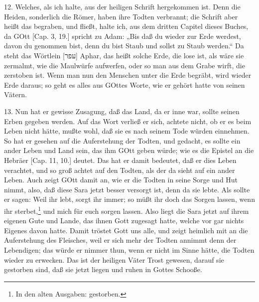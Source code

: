12. Welches, als ich halte, aus der heiligen Schrift hergekommen ist. Denn die Heiden, sonderlich die Römer, haben ihre Todten verbrannt; die Schrift aber heißt das begraben, und fließt, halte ich, aus dem dritten Capitel dieses Buches, da GOtt [Cap. 3, 19.] spricht zu Adam: „Bis daß du wieder zur Erde werdest, davon du genommen bist, denn du bist Staub und sollst zu Staub werden.“ Da steht das Wörtlein [עפר] Aphar, das heißt solche Erde, die lose ist, als wäre sie zermalmt, wie die Maulwürfe aufwerfen, oder so man aus dem Grabe wirft, die zerstoben ist. Wenn man nun den Menschen unter die Erde begräbt, wird wieder Erde daraus; so geht es alles aus GOttes Worte, wie er gehört hatte von seinen Vätern.

13. Nun hat er gewisse Zusagung, daß das Land, da er inne war, sollte seinen Erben gegeben werden. Auf das Wort verließ er sich, achtete nicht, ob er es beim Leben nicht hätte, mußte wohl, daß sie es nach seinem Tode würden einnehmen. So hat er gesehen auf die Auferstehung der Todten, und gedacht, es sollte ein ander Leben und Land sein, das ihm GOtt geben würde; wie es die Epistel an die Hebräer [Cap. 11, 10.] deutet. Das hat er damit bedeutet, daß er dies Leben verachtet, und so groß achtet auf den Todten, als der da sieht auf ein ander Leben. Auch zeigt GOtt damit an, wie er die Todten in seine Sorge und Hut nimmt, also, daß diese Sara jetzt besser versorgt ist, denn da sie lebte. Als sollte er sagen: Weil ihr lebt, sorgt ihr immer; so müßt ihr doch das Sorgen lassen, wenn ihr sterbet,\footnote{In den alten Ausgaben: gestorben.} und mich für euch sorgen lassen. Also liegt die Sara jetzt auf ihrem eigenen Gute und Lande, das ihnen
Gott zugesagt hatte, welche vor gar nichts Eigenes davon hatte. Damit tröstet Gott uns alle, und zeigt heimlich mit an die Auferstehung des Fleisches, weil er sich mehr der Todten annimmt denn der Lebendigen; das würde er nimmer thun, wenn er nicht im Sinne hätte, die Todten wieder zu erwecken. Das ist der heiligen Väter Trost gewesen, darauf sie gestorben sind, daß sie jetzt liegen und ruhen in Gottes Schooße.

